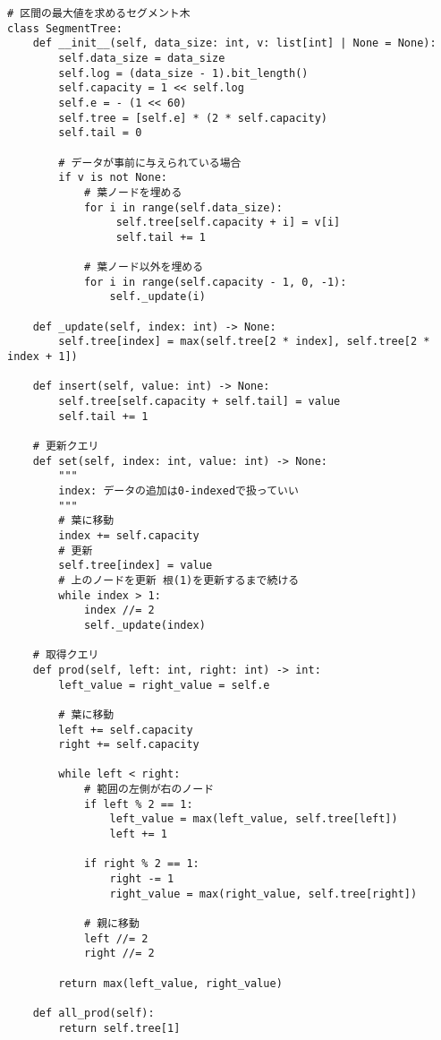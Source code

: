 \documentclass{jlreq}
\begin{document}
\begin{lstlisting}[caption=セグメント木の実装, label=segment, frame=TRBL, label={segment}]
# 区間の最大値を求めるセグメント木
class SegmentTree:
    def __init__(self, data_size: int, v: list[int] | None = None):
        self.data_size = data_size
        self.log = (data_size - 1).bit_length()
        self.capacity = 1 << self.log
        self.e = - (1 << 60)
        self.tree = [self.e] * (2 * self.capacity)
        self.tail = 0

        # データが事前に与えられている場合
        if v is not None:
            # 葉ノードを埋める
            for i in range(self.data_size):
                 self.tree[self.capacity + i] = v[i]
                 self.tail += 1
                 
            # 葉ノード以外を埋める 
            for i in range(self.capacity - 1, 0, -1):
                self._update(i)
    
    def _update(self, index: int) -> None:
        self.tree[index] = max(self.tree[2 * index], self.tree[2 * index + 1])

    def insert(self, value: int) -> None:
        self.tree[self.capacity + self.tail] = value
        self.tail += 1

    # 更新クエリ
    def set(self, index: int, value: int) -> None:
        """
		index: データの追加は0-indexedで扱っていい
		"""
        # 葉に移動 
        index += self.capacity
        # 更新
        self.tree[index] = value
        # 上のノードを更新 根(1)を更新するまで続ける
        while index > 1:
            index //= 2
            self._update(index)
            
    # 取得クエリ
    def prod(self, left: int, right: int) -> int:
        left_value = right_value = self.e
        
        # 葉に移動
        left += self.capacity
        right += self.capacity
        
        while left < right:
            # 範囲の左側が右のノード
            if left % 2 == 1:
                left_value = max(left_value, self.tree[left])
                left += 1
            
            if right % 2 == 1:
                right -= 1
                right_value = max(right_value, self.tree[right])
                
            # 親に移動
            left //= 2 
            right //= 2
        
        return max(left_value, right_value)

    def all_prod(self):
        return self.tree[1]
\end{lstlisting}
\end{document}
